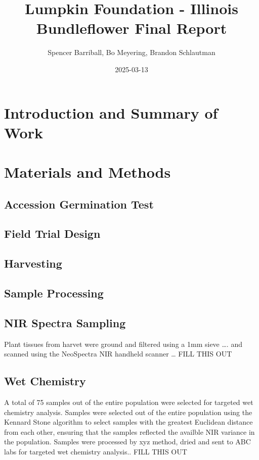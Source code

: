 \documentclass[
]{article}
\title{Lumpkin Foundation - Illinois Bundleflower Final Report}
\author{Spencer Barriball, Bo Meyering, Brandon Schlautman}
\date{2025-03-13}
\begin{document}
\maketitle

\section{Introduction and Summary of
Work}\label{introduction-and-summary-of-work}

\section{Materials and Methods}\label{materials-and-methods}

\subsection{Accession Germination
Test}\label{accession-germination-test}

\subsection{Field Trial Design}\label{field-trial-design}

\subsection{Harvesting}\label{harvesting}

\subsection{Sample Processing}\label{sample-processing}

\subsection{NIR Spectra Sampling}\label{nir-spectra-sampling}

Plant tissues from harvet were ground and filtered using a 1mm sieve
\ldots. and scanned using the NeoSpectra NIR handheld scanner \ldots{}
FILL THIS OUT

\subsection{Wet Chemistry}\label{wet-chemistry}

A total of 75 samples out of the entire population were selected for
targeted wet chemistry analysis. Samples were selected out of the entire
population using the Kennard Stone algorithm to select samples with the
greatest Euclidean distance from each other, ensuring that the samples
reflected the availble NIR variance in the population. Samples were
processed by xyz method, dried and sent to ABC labs for targeted wet
chemistry analysis.. FILL THIS OUT
\end{document}
